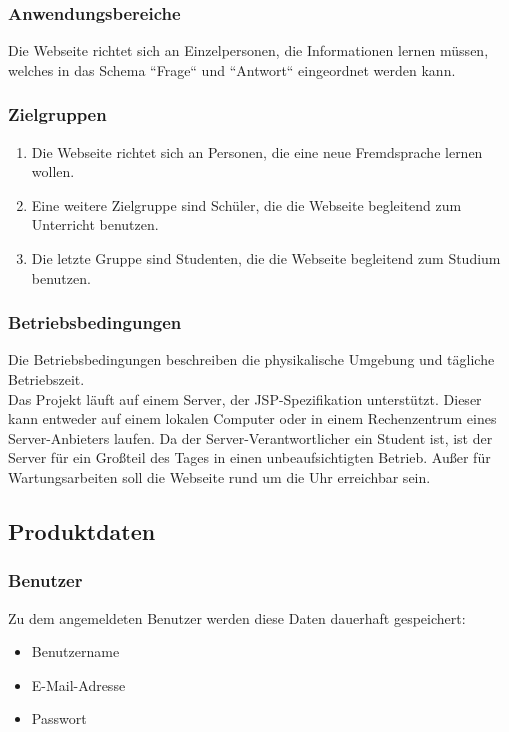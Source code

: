 \subsubsection{Anwendungsbereiche}
Die Webseite richtet sich an Einzelpersonen, die Informationen lernen müssen, welches in das Schema ``Frage`` und ``Antwort`` eingeordnet werden kann.

\subsubsection{Zielgruppen}
\begin{enumerate}[leftmargin=2cm, label=\bfseries /ZG\arabic*0/]
	\item Die Webseite richtet sich an Personen, die eine neue Fremdsprache lernen wollen.
	\item Eine weitere Zielgruppe sind Schüler, die die Webseite begleitend zum Unterricht benutzen.
	\item Die letzte Gruppe sind Studenten, die die Webseite begleitend zum Studium benutzen.
\end{enumerate}


\subsubsection{Betriebsbedingungen}
Die Betriebsbedingungen beschreiben die physikalische Umgebung und tägliche Betriebszeit.\\

\noindent Das Projekt läuft auf einem Server, der JSP-Spezifikation unterstützt. Dieser kann entweder auf einem lokalen Computer oder in einem Rechenzentrum eines Server-Anbieters laufen. Da der Server-Verantwortlicher ein Student ist, ist der Server für ein Großteil des Tages in einen unbeaufsichtigten Betrieb. Außer für Wartungsarbeiten soll die Webseite rund um die Uhr erreichbar sein.


\subsection{Produktdaten}
\subsubsection{Benutzer}
Zu dem angemeldeten Benutzer werden diese Daten dauerhaft gespeichert:
\begin{itemize}
	\item Benutzername
	\item E-Mail-Adresse
	\item Passwort
\end{itemize}

